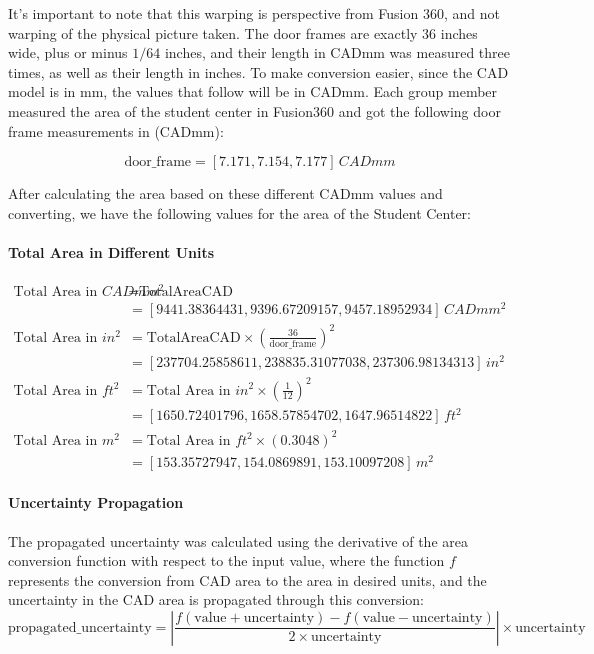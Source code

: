 \documentclass{article}
\begin{document}
It's important to note that this warping is perspective from Fusion 360, and not warping of the physical picture taken. The door frames are exactly 36 inches wide, plus or minus \(1/64\) inches, and their length in CADmm was measured three times, as well as their length in inches. To make conversion easier, since the CAD model is in mm, the values that follow will be in CADmm. Each group member measured the area of the student center in Fusion360 and got the following door frame measurements in (CADmm):

\[
\text{door\_frame} = [7.171, 7.154, 7.177] \, CADmm
\]

After calculating the area based on these different CADmm values and converting, we have the following values for the area of the Student Center:

\paragraph{Total Area in Different Units}
\begin{align*}
\text{Total Area in } CADmm^2 &= \text{TotalAreaCAD}  \\
&= \left[9441.38364431, 9396.67209157, 9457.18952934 \right] \, CADmm^2 \\
\text{Total Area in } in^2 &= \text{TotalAreaCAD} \times \left(\frac{36}{\text{door\_frame}}\right)^2 \\
&= \left[237704.25858611, 238835.31077038, 237306.98134313\right] \, in^2 \\
\text{Total Area in } ft^2 &= \text{Total Area in } in^2 \times \left(\frac{1}{12}\right)^2 \\
&= \left[1650.72401796, 1658.57854702, 1647.96514822\right] \, ft^2 \\
\text{Total Area in } m^2 &= \text{Total Area in } ft^2 \times (0.3048)^2 \\
&= \left[153.35727947, 154.0869891, 153.10097208\right] \, m^2
\end{align*}

\paragraph{Uncertainty Propagation}
The propagated uncertainty was calculated using the derivative of the area conversion function with respect to the input value, where the function \(f\) represents the conversion from CAD area to the area in desired units, and the uncertainty in the CAD area is propagated through this conversion:
	\[
	\text{propagated\_uncertainty} = \left| \frac{f(\text{value} + \text{uncertainty}) - f(\text{value} - \text{uncertainty})}{2 \times \text{uncertainty}} \right| \times \text{uncertainty}
	\]
\end{document}
